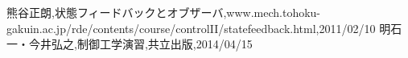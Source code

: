\begin{thebibliography}{8}
 熊谷正朗,状態フィードバックとオブザーバ,www.mech.tohoku-gakuin.ac.jp\slash{}rde\slash{}contents\slash{}course\slash{}controlII\slash{}statefeedback.html,2011\slash{}02\slash{}10
 明石　一・今井弘之,制御工学演習,共立出版,2014\slash{}04\slash{}15
\end{thebibliography}



